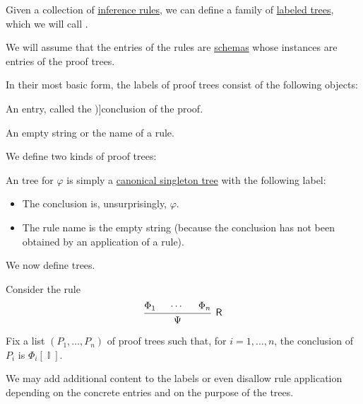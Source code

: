 \begin{concept}\label{con:proof_tree}
  Given a collection of \hyperref[def:inference_rule]{inference rules}, we can define a family of \hyperref[def:labeled_tree]{labeled trees}, which we will call .

  We will assume that the entries of the rules are \hyperref[con:schemas_and_instances]{schemas} whose instances are entries of the proof trees.

  In their most basic form, the labels of proof trees consist of the following objects:
  \begin{thmenum}[series=con:proof_tree]
     An entry, called the \term[en=conclusion (\cite[22]{TroelstraSchwichtenberg2000BasicProofTheory})]{conclusion} of the proof.

     An empty string or the name of a rule.
  \end{thmenum}

  We define two kinds of proof trees:
  \begin{thmenum}[resume=con:proof_tree]
     An  tree for \( \varphi \) is simply a \hyperref[def:canonical_singleton_tree]{canonical singleton tree} with the following label:
    \begin{itemize}
      \item The conclusion is, unsurprisingly, \( \varphi \).
      \item The rule name is the empty string (because the conclusion has not been obtained by an application of a rule).
    \end{itemize}

     We now define  trees.

    Consider the rule
    \begin{equation*}
      \begin{prooftree}
        \hypo{ \Phi_1 }
        \hypo{ \cdots }
        \hypo{ \Phi_n }
        \infer3[\logic{R}]{ \Psi }
      \end{prooftree}
    \end{equation*}

    Fix a list \( (P_1, \ldots, P_n) \) of proof trees such that, for \( i = 1, \ldots, n \), the conclusion of \( P_i \) is \( \Phi_i[\BbbI] \).

    We may add additional content to the labels or even disallow rule application depending on the concrete entries and on the purpose of the trees.


\end{thmenum}
\end{concept}
